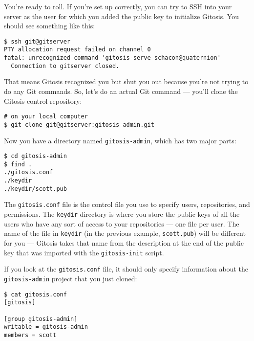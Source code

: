 \documentclass[a4paper]{book}
\newcounter{tab}[chapter]
\begin{document}
You're ready to roll. If you're set up correctly, you can try to SSH into your server as the user for which you added the public key to initialize Gitosis. You should see something like this:

\begin{shaded}\begin{verbatim}
$ ssh git@gitserver
PTY allocation request failed on channel 0
fatal: unrecognized command 'gitosis-serve schacon@quaternion'
  Connection to gitserver closed.
\end{verbatim}\end{shaded}

That means Gitosis recognized you but shut you out because you're not trying to do any Git commands. So, let's do an actual Git command --- you'll clone the Gitosis control repository:

\begin{shaded}\begin{verbatim}
# on your local computer
$ git clone git@gitserver:gitosis-admin.git
\end{verbatim}\end{shaded}

Now you have a directory named \texttt{gitosis-admin}, which has two major parts:

\begin{shaded}\begin{verbatim}
$ cd gitosis-admin
$ find .
./gitosis.conf
./keydir
./keydir/scott.pub
\end{verbatim}\end{shaded}

The \texttt{gitosis.conf} file is the control file you use to specify users, repositories, and permissions. The \texttt{keydir} directory is where you store the public keys of all the users who have any sort of access to your repositories --- one file per user. The name of the file in \texttt{keydir} (in the previous example, \texttt{scott.pub}) will be different for you --- Gitosis takes that name from the description at the end of the public key that was imported with the \texttt{gitosis-init} script.

If you look at the \texttt{gitosis.conf} file, it should only specify information about the \texttt{gitosis-admin} project that you just cloned:

\begin{shaded}\begin{verbatim}
$ cat gitosis.conf
[gitosis]

[group gitosis-admin]
writable = gitosis-admin
members = scott
\end{verbatim}\end{shaded}
\end{document}
